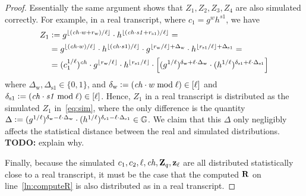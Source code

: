 \documentclass[11pt]{article}
\begin{document}
\begin{proof}
Essentially the same argument shows that $Z_1, Z_2, Z_3, Z_4$ are
also simulated correctly. 
For example, in a real transcript, where $c_1 = g^w h^\mathit{s1}$, we have
\begin{align*}
    Z_1 & \mathrel{\mathop:}= g^{\lfloor (\mathit{ch}\cdot w + r_\text{w}) / \ell \rfloor} \cdot 
             h^{\lfloor (\mathit{ch}\cdot \mathit{s1} + r_\text{s1}) / \ell \rfloor} = \\
       & =   g^{\lfloor (\mathit{ch}\cdot w) / \ell \rfloor} \cdot
             h^{\lfloor (\mathit{ch}\cdot s1) / \ell \rfloor} \cdot
             g^{\lfloor r_\text{w} / \ell \rfloor + \Delta_\text{w}} \cdot 
             h^{\lfloor r_\text{s1} / \ell \rfloor + \Delta_\text{s1}} =  \\
       & = (c_1^{1/\ell})^\mathit{ch} \cdot
             g^{\lfloor r_\text{w} / \ell \rfloor} \cdot 
             h^{\lfloor r_\text{s1} / \ell \rfloor} \cdot 
             \left[ (g^{1/\ell})^{\delta_\text{w} + \ell \cdot \Delta_\text{w}} \cdot 
               (h^{1/\ell})^{\delta_\text{s1} + \ell \cdot \Delta_\text{s1}} \right]
\end{align*}
where $\Delta_\text{w}, \Delta_\text{s1} \in \{0,1\}$,
and $\delta_\text{w} \mathrel{\mathop:}= (\mathit{ch} \cdot w \bmod \ell) \in [{\ell}]$
and $\delta_\text{s1} \mathrel{\mathop:}= (\mathit{ch} \cdot \mathit{s1} \bmod \ell) \in [{\ell}]$.
Hence, $Z_1$ in a real transcript is distributed as 
the simulated $Z_1$ in~\eqref{eq:sim}, where the only
difference is the quantity 
$\Delta \mathrel{\mathop:}= (g^{1/\ell})^{\delta_\text{w} - \ell \cdot \Delta_\text{w}} \cdot 
               (h^{1/\ell})^{\delta_\text{s1} - \ell \cdot \Delta_\text{s1}} \in \mathbb G$. 
We claim that this $\Delta$ only negligibly affects the statistical distance
between the real and simulated distributions. 
{\bf TODO:} explain why.

Finally, because the simulated $c_1, c_2, \ell, \mathit{ch}, \mathbf{Z}_q, \mathbf{z}_\ell$
are all distributed statistically close to a real transcript, 
it must be the case that the computed $\mathbf{R}$ 
on line~\eqref{ln:computeR} is also distributed as in 
a real transcript. 
\end{proof}
\end{document}
